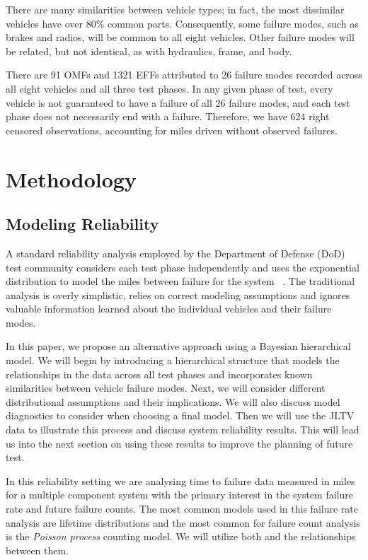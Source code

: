 \documentclass[12pt]{article}
\begin{document}
There are many similarities between vehicle types; in fact, the most dissimilar
vehicles have over 80\% common parts. Consequently, some failure modes, such as
brakes and radios, will be common to all eight vehicles. Other failure modes
will be related, but not identical, as with hydraulics, frame, and body.

There are 91 OMFs and 1321 EFFs attributed to 26 failure modes recorded across
all eight vehicles and all three test phases. In any given phase of test, every
vehicle is not guaranteed to have a failure of all 26 failure modes, and each
test phase does not necessarily end with a failure. Therefore, we have 624 right
censored observations, accounting for miles driven without observed failures.

\section{Methodology}

\subsection{Modeling Reliability}
A standard reliability analysis employed by the Department of Defense (DoD) test
community considers each test phase independently and uses the exponential
distribution to model the miles between failure for the system ~\cite{ref1}. The
traditional analysis is overly simplistic, relies on correct modeling
assumptions and ignores valuable information learned about the individual
vehicles and their failure modes.

In this paper, we propose an alternative approach using a Bayesian hierarchical
model.  We will begin by introducing a hierarchical structure that models the
relationships in the data across all test phases and incorporates known
similarities between vehicle failure modes.  Next, we will consider different
distributional assumptions and their implications.  We will also
discuss model diagnostics to consider when choosing a final model. Then we will
use the JLTV data to illustrate this process and discuss system reliability
results. This will lead us into the next section on using these results to
improve the planning of future test.

In this reliability setting we are analysing time to failure data measured in
miles for a multiple component system with the primary interest in the system
failure rate and future failure counts.  The most common models used in this
failure rate analysis are lifetime distributions and the most common for failure
count analysis is the \emph{Poisson process} counting model.  We will utilize
both and the relationships between them.
\end{document}
